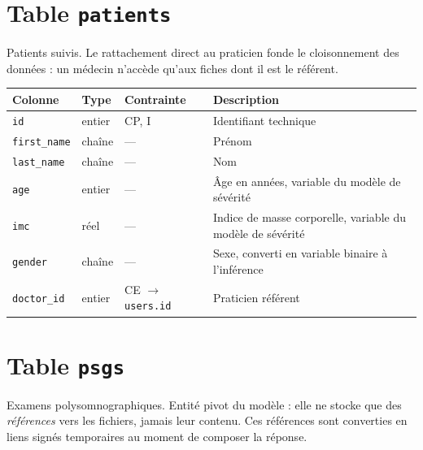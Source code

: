\section{Table \texttt{patients}}

Patients suivis. Le rattachement direct au praticien fonde le cloisonnement des
données : un médecin n'accède qu'aux fiches dont il est le référent.

\begin{table}[H]
\centering
\small
\begin{tabular}{@{}lllL{6.2cm}@{}}
\toprule
\textbf{Colonne} & \textbf{Type} & \textbf{Contrainte} & \textbf{Description} \\
\midrule
\texttt{id}         & entier & CP, I & Identifiant technique \\
\texttt{first\_name}& chaîne & ---   & Prénom \\
\texttt{last\_name} & chaîne & ---   & Nom \\
\texttt{age}        & entier & ---   & Âge en années, variable du modèle de sévérité \\
\texttt{imc}        & réel   & ---   & Indice de masse corporelle, variable du modèle
                                       de sévérité \\
\texttt{gender}     & chaîne & ---   & Sexe, converti en variable binaire à
                                       l'inférence \\
\texttt{doctor\_id} & entier & CE $\to$ \texttt{users.id} & Praticien référent \\
\bottomrule
\end{tabular}
\end{table}

\section{Table \texttt{psgs}}

Examens polysomnographiques. Entité pivot du modèle : elle ne stocke que des
\emph{références} vers les fichiers, jamais leur contenu. Ces références sont
converties en liens signés temporaires au moment de composer la réponse.

